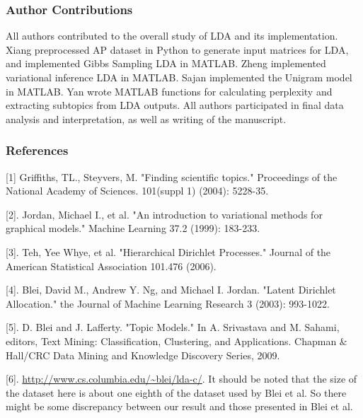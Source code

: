 \documentclass{article} %
\begin{document}
\subsubsection*{Author Contributions}
All authors contributed to the overall study of LDA and its implementation. Xiang preprocessed AP dataset in Python to generate input matrices for LDA, and implemented Gibbs Sampling LDA in MATLAB. Zheng implemented variational inference LDA in MATLAB. Sajan implemented the Unigram model in MATLAB. Yan wrote MATLAB functions for calculating perplexity and extracting subtopics from LDA outputs. All authors participated in final data analysis and interpretation, as well as writing of the manuscript.

\subsubsection*{References}


\small{

[1] Griffiths, TL., Steyvers, M. "Finding scientific topics." Proceedings of the National Academy of Sciences.  101(suppl 1) (2004): 5228-35.

[2]. Jordan, Michael I., et al. "An introduction to variational methods for graphical models." Machine Learning 37.2 (1999): 183-233.

[3]. Teh, Yee Whye, et al. "Hierarchical Dirichlet Processes." Journal of the American Statistical Association 101.476 (2006).

[4]. Blei, David M., Andrew Y. Ng, and Michael I. Jordan. "Latent Dirichlet Allocation." the Journal of Machine Learning Research 3 (2003): 993-1022.

[5]. D. Blei and J. Lafferty. "Topic Models." In A. Srivastava and M. Sahami, editors, Text Mining: Classification, Clustering, and Applications. Chapman $\&$ Hall/CRC Data Mining and Knowledge Discovery Series, 2009.

[6]. \url{http://www.cs.columbia.edu/~blei/lda-c/}. It should be noted that the size of the dataset here is about one eighth of the dataset used by Blei et al. So there might be some discrepancy between our result and those presented in Blei et al.
%
%
}
\end{document}
